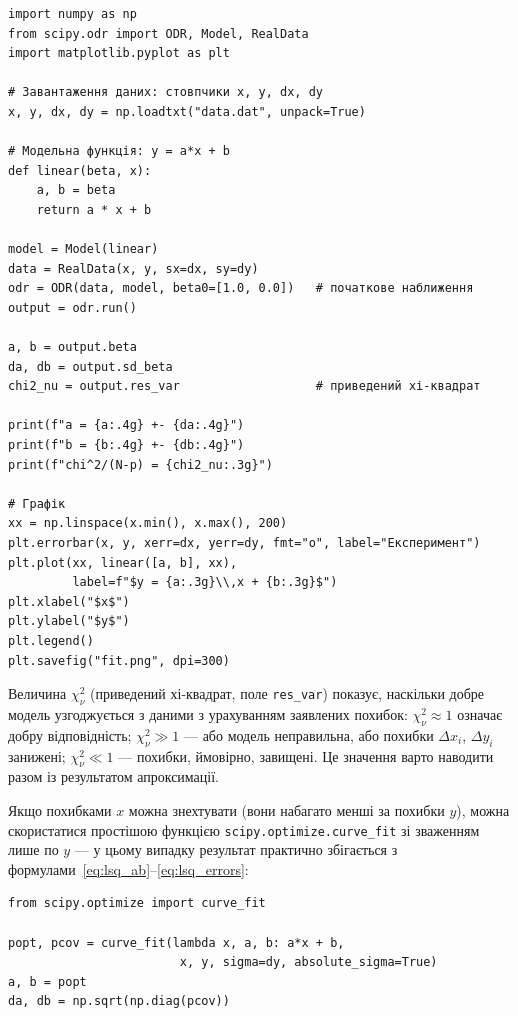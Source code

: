\bgroup
\begin{verbatim}
import numpy as np
from scipy.odr import ODR, Model, RealData
import matplotlib.pyplot as plt

# Завантаження даних: стовпчики x, y, dx, dy
x, y, dx, dy = np.loadtxt("data.dat", unpack=True)

# Модельна функція: y = a*x + b
def linear(beta, x):
    a, b = beta
    return a * x + b

model = Model(linear)
data = RealData(x, y, sx=dx, sy=dy)
odr = ODR(data, model, beta0=[1.0, 0.0])   # початкове наближення
output = odr.run()

a, b = output.beta
da, db = output.sd_beta
chi2_nu = output.res_var                   # приведений хі-квадрат

print(f"a = {a:.4g} +- {da:.4g}")
print(f"b = {b:.4g} +- {db:.4g}")
print(f"chi^2/(N-p) = {chi2_nu:.3g}")

# Графік
xx = np.linspace(x.min(), x.max(), 200)
plt.errorbar(x, y, xerr=dx, yerr=dy, fmt="o", label="Експеримент")
plt.plot(xx, linear([a, b], xx),
         label=f"$y = {a:.3g}\\,x + {b:.3g}$")
plt.xlabel("$x$")
plt.ylabel("$y$")
plt.legend()
plt.savefig("fit.png", dpi=300)
\end{verbatim}
\egroup

Величина $\chi^2_\nu$ (приведений хі-квадрат, поле \texttt{res\_var})
показує, наскільки добре модель узгоджується з даними з урахуванням
заявлених похибок: $\chi^2_\nu \approx 1$ означає добру відповідність;
$\chi^2_\nu \gg 1$ --- або модель неправильна, або похибки $\Delta
x_i$, $\Delta y_i$ занижені; $\chi^2_\nu \ll 1$ --- похибки, ймовірно,
завищені. Це значення варто наводити разом із результатом апроксимації.

Якщо похибками $x$ можна знехтувати (вони набагато менші за похибки
$y$), можна скористатися простішою функцією
\texttt{scipy.optimize.curve_fit} зі зваженням лише по
$y$ --- у цьому випадку результат практично збігається з
формулами~\eqref{eq:lsq_ab}--\eqref{eq:lsq_errors}:
\begin{verbatim}
from scipy.optimize import curve_fit

popt, pcov = curve_fit(lambda x, a, b: a*x + b,
                        x, y, sigma=dy, absolute_sigma=True)
a, b = popt
da, db = np.sqrt(np.diag(pcov))
\end{verbatim}

